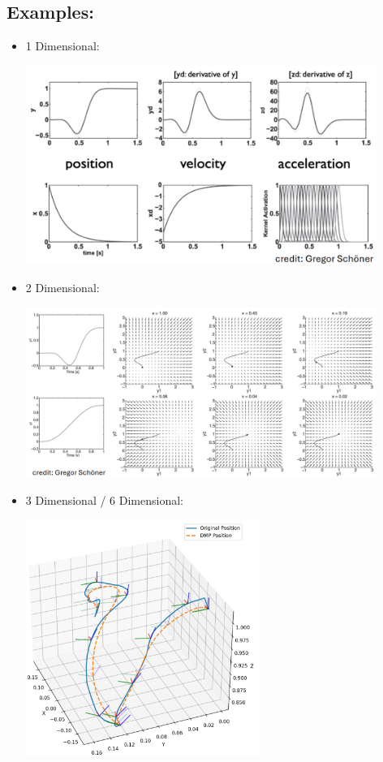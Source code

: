 \documentclass[10pt]{article}
\begin{document}
\subsection*{Examples:}
\begin{itemize}
	\item 1 Dimensional:
	\begin{center} 
        \includegraphics*[width=0.9\textwidth]{L1_11.png} 
    \end{center}
    \item 2 Dimensional:
    \begin{center} 
        \includegraphics*[width=0.9\textwidth]{L1_12.png} 
    \end{center}
    \item 3 Dimensional / 6 Dimensional:
    \begin{center} 
        \includegraphics*[width=0.6\textwidth]{L1_13.png} 
    \end{center}
\end{itemize}
\end{document}
